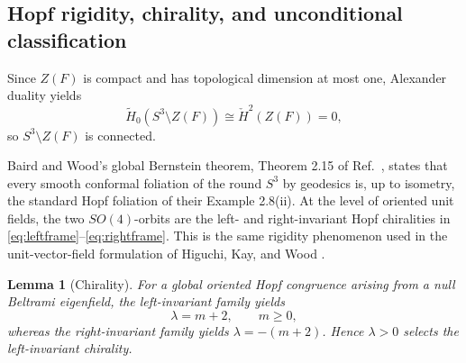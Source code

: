 \documentclass[aps,prd,reprint,nofootinbib,superscriptaddress]{revtex4-2}
\newtheorem{lemma}[theorem]{Lemma}
\theoremstyle{definition}
\theoremstyle{remark}
\begin{document}
\subsection{Hopf rigidity, chirality, and unconditional classification}

Since $Z(F)$ is compact and has topological dimension at most one, Alexander duality yields
\begin{equation}
\widetilde H_0(S^3\setminus Z(F))
\cong \check H^2(Z(F))=0,
\label{eq:Alexander}
\end{equation}
so $S^3\setminus Z(F)$ is connected.

Baird and Wood's global Bernstein theorem, Theorem 2.15 of Ref.~\cite{BairdWood1991}, states that every smooth conformal foliation of the round $S^3$ by geodesics is, up to isometry, the standard Hopf foliation of their Example 2.8(ii).  At the level of oriented unit fields, the two $SO(4)$-orbits are the left- and right-invariant Hopf chiralities in \eqref{eq:leftframe}--\eqref{eq:rightframe}.  This is the same rigidity phenomenon used in the unit-vector-field formulation of Higuchi, Kay, and Wood \cite{HiguchiKayWood2001}.

\begin{lemma}[Chirality]
\label{lem:chirality}
For a global oriented Hopf congruence arising from a null Beltrami eigenfield, the left-invariant family yields
\[
\lambda=m+2,\qquad m\ge0,
\]
whereas the right-invariant family yields $\lambda=-(m+2)$. Hence $\lambda>0$ selects the left-invariant chirality.
\end{lemma}
\end{document}
